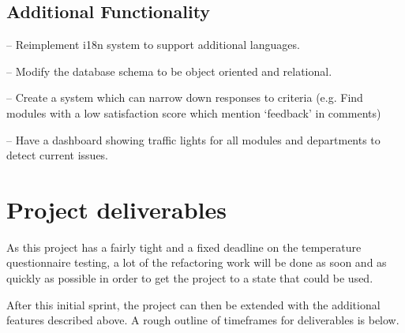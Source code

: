 \documentclass[11pt,fleqn,twoside]{article}
\begin{document}
\subsection{Additional Functionality}
\begin{description}[itemindent=-2em,leftmargin=4em]
	\item[Internationalisation (i18n)] -- Reimplement i18n system to support additional languages.
	\item[Relational Database] -- Modify the database schema to be object oriented and relational.
	\item[Advanced Analytics] -- Create a system which can narrow down responses to criteria (e.g. Find modules with a low satisfaction score which mention `feedback' in comments)
	\item[Traffic Light Dashboard] -- Have a dashboard showing traffic lights for all modules and departments to detect current issues.
\end{description}


\section{Project deliverables}

As this project has a fairly tight and a fixed deadline on the temperature questionnaire testing, a lot of the refactoring work will be done as soon and as quickly as possible in order to get the project to a state that could be used.

After this initial sprint, the project can then be extended with the additional features described above.
A rough outline of timeframes for deliverables is below.
\end{document}
